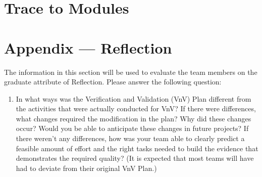 \documentclass[12pt, titlepage]{article}
\begin{document}
\section{Trace to Modules}		




\newpage{}
\section*{Appendix --- Reflection}

The information in this section will be used to evaluate the team members on the
graduate attribute of Reflection.  Please answer the following question:

\begin{enumerate}
  \item In what ways was the Verification and Validation (VnV) Plan different
  from the activities that were actually conducted for VnV?  If there were
  differences, what changes required the modification in the plan?  Why did
  these changes occur?  Would you be able to anticipate these changes in future
  projects?  If there weren't any differences, how was your team able to clearly
  predict a feasible amount of effort and the right tasks needed to build the
  evidence that demonstrates the required quality?  (It is expected that most
  teams will have had to deviate from their original VnV Plan.)

\end{enumerate}
\end{document}
